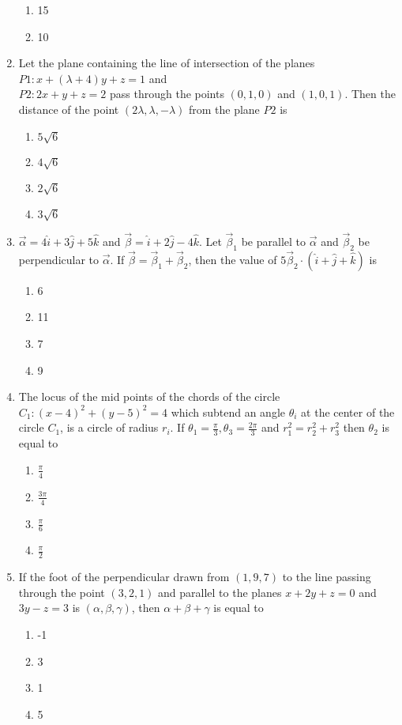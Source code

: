 \documentclass[journal]{IEEEtran}
\begin{document}
\begin{enumerate}
\begin{enumerate}
    \item 15
    \item 10
\end{enumerate}
\item Let the plane containing the line of intersection
of the planes \\
$P1: x + (\lambda + 4)y + z = 1$ and \\
$P2 : 2x + y + z = 2$ pass through the points $(0, 1, 0)$
and $(1, 0, 1)$. Then the distance of the point
$(2\lambda, \lambda, -\lambda)$ from the plane $P2$ is
\begin{enumerate}
    \item $ 5\sqrt{6}$
    \item $ 4\sqrt{6}$
    \item $ 2\sqrt{6}$
    \item $ 3\sqrt{6}$
\end{enumerate}
\item $\overrightarrow{\alpha}=4\hat{i}+3\hat{j}+5\hat{k}$ and $ \overrightarrow{\beta}=\hat{i}+2\hat{j}-4\hat{k}$. Let  $\overrightarrow{\beta}_{1}$ be parallel to $\overrightarrow{\alpha}$ and $\overrightarrow{\beta}_{2}$ be perpendicular to $\overrightarrow{\alpha}$. If $\overrightarrow{\beta}=\overrightarrow{\beta}_{1}+\overrightarrow{\beta}_{2}$, then the value of $5\overrightarrow{\beta}_{2}\cdot(\hat{i}+\hat{j}+\hat{k})$ is
\begin{enumerate}
    \item 6
    \item 11
    \item 7
    \item 9
\end{enumerate}
\item The locus of the mid points of the chords of the
circle $C_{1}:(x-4)^{2}+(y-5)^{2}=4$ which subtend an angle $\theta_{i}$ at the center of the circle $C_{1}$, is a circle of radius $ r_{i}$. If $ \theta_{1}=\frac{\pi}{3},\theta_{3}=\frac{2\pi}{3} $ and $ r_{1}^{2}=r_{2}^{2}+r_{3}^{2}$ then $\theta_{2}$ is equal to  
\begin{enumerate}
    \item $\frac{\pi}{4}$
    \item $\frac{3\pi}{4}$
    \item $\frac{\pi}{6}$
    \item $\frac{\pi}{2}$

\end{enumerate}
\item If the foot of the perpendicular drawn from $(1, 9,
7)$ to the line passing through the point $(3, 2, 1)$ and
parallel to the planes $x + 2y + z = 0$ and $3y-z = 3$
is $(\alpha, \beta, \gamma)$, then $\alpha + \beta + \gamma$ is equal to
\begin{enumerate}
    \item -1
    \item 3
    \item 1
    \item 5
\end{enumerate}
\end{enumerate}
\end{document}
